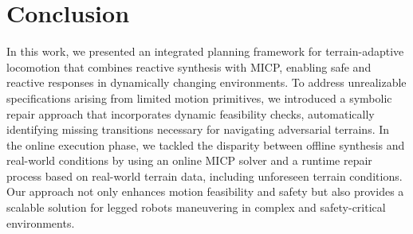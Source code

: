 \section{Conclusion}
In this work, we presented an integrated planning framework for terrain-adaptive locomotion that combines reactive synthesis with MICP, enabling safe and reactive responses in dynamically changing environments. 
To address unrealizable specifications arising from limited motion primitives, we introduced a symbolic repair approach that incorporates dynamic feasibility checks, automatically identifying missing transitions necessary for navigating adversarial terrains. In the online execution phase, we tackled the disparity between offline synthesis and real-world conditions by using an online MICP solver and a runtime repair process based on real-world terrain data, including unforeseen terrain conditions. 
Our approach not only enhances motion feasibility and safety but also provides a scalable solution for legged robots maneuvering in complex and safety-critical environments. 
%

